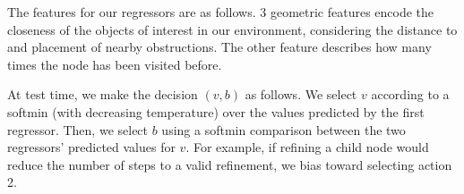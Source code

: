 The features for our regressors are as follows. 3 geometric features encode the closeness of the objects
of interest in our environment, considering the distance to and placement of nearby obstructions. The other
feature describes how many times the node has been visited before.

At test time, we make the decision $(v, b)$ as follows. We select $v$ according to a softmin (with decreasing temperature) over the values
predicted by the first regressor. Then, we select $b$ using a softmin comparison between the two regressors'
predicted values for $v$. For example, if refining a child node would reduce the number of steps to a valid refinement,
we bias toward selecting action 2.